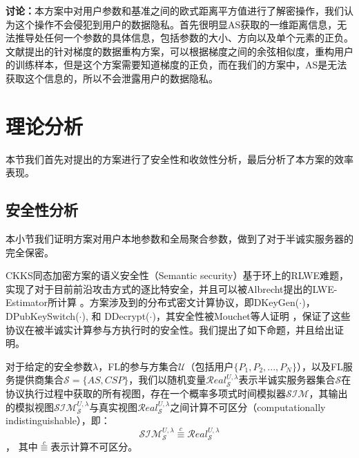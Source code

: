 \textbf{讨论：}本方案中对用户参数和基准之间的欧式距离平方值进行了解密操作，我们认为这个操作不会侵犯到用户的数据隐私。首先很明显AS获取的一维距离信息，无法推导处任何一个参数的具体信息，包括参数的大小、方向以及单个元素的正负。文献\cite{geiping2020inverting}提出的针对梯度的数据重构方案，可以根据梯度之间的余弦相似度，重构用户的训练样本，但是这个方案需要知道梯度的正负，而在我们的方案中，AS是无法获取这个信息的，所以不会泄露用户的数据隐私。

\section{理论分析}\label{ana}
本节我们首先对提出的方案进行了安全性和收敛性分析，最后分析了本方案的效率表现。
\subsection{安全性分析}
本小节我们证明方案对用户本地参数和全局聚合参数，做到了对于半诚实服务器的完全保密。

CKKS同态加密方案的语义安全性（Semantic security）基于环上的RLWE难题\cite{cheon2017homomorphic, lindner2011better, lyubashevsky2010ideal}，实现了对于目前前沿攻击方式的逐比特安全，并且可以被Albrecht提出的LWE-Estimator所计算 \cite{albrecht2019homomorphic, albrecht2015concrete}。方案涉及到的分布式密文计算协议，即DKeyGen($\cdot$)，DPubKeySwitch($\cdot$), 和 DDecrypt($\cdot$)，其安全性被Mouchet等人证明 \cite{mouchet2020multiparty}，保证了这些协议在被半诚实计算参与方执行时的安全性。我们提出了如下命题，并且给出证明。
\begin{proposition}[对半诚实服务器的安全性]\label{pro1}
	对于给定的安全参数$ \lambda $，FL的参与方集合$\mathcal{U}$（包括用户$\{P_1, P_2,...,P_N\}$），以及FL服务提供商集合$\mathcal{S} = \{AS, CSP\}$，我们以随机变量$\mathcal{R} e a l_{\mathcal{S}}^{U, \lambda}$表示半诚实服务器集合$\mathcal{S}$在协议执行过程中获取的所有视图，存在一个概率多项式时间模拟器$\mathcal{SIM}$，其输出的模拟视图$ \mathcal{S I} \mathcal{M}_{\mathcal{S}}^{U, \lambda} $与真实视图$\mathcal{R} e a l_{\mathcal{S}}^{U, \lambda}$之间计算不可区分（computationally indistinguishable），即：
	$$
		\mathcal{S I} \mathcal{M}_{\mathcal{S}}^{U, \lambda} \stackrel{c}{\equiv} \mathcal{R} e a l_{\mathcal{S}}^{U, \lambda}
	$$，
	其中$\mathop{\equiv}\limits^{c}$表示计算不可区分。
\end{proposition}

